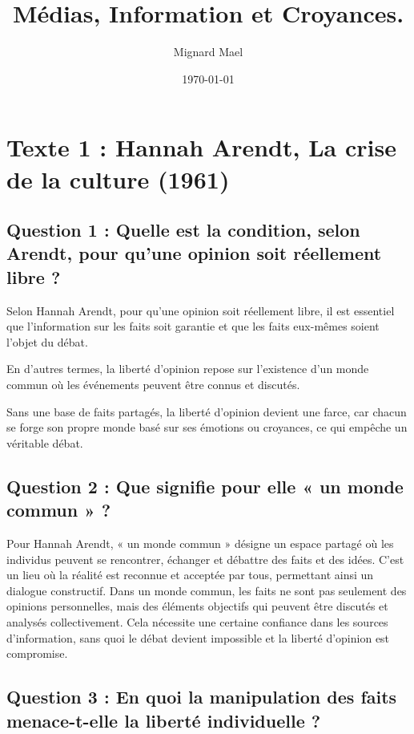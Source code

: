 \documentclass[a4paper,12pt]{article}
\title{Médias, Information et Croyances.}
\author{Mignard Mael}
\date{\today}
\begin{document}
\maketitle

\section{Texte 1 : Hannah Arendt, La crise de la culture (1961)}
\vspace{1cm}

\subsection{Question 1 : Quelle est la condition, selon Arendt, pour qu’une opinion soit réellement libre ?}
Selon Hannah Arendt, pour qu’une opinion soit réellement libre, il est essentiel que l’information sur les faits soit garantie et que les faits eux-mêmes soient l’objet du débat. 

En d'autres termes, la liberté d’opinion repose sur l’existence d’un monde commun où les événements peuvent être connus et discutés. 

Sans une base de faits partagés, la liberté d’opinion devient une farce, car chacun se forge son propre monde basé sur ses émotions ou croyances, ce qui empêche un véritable débat.

\subsection{Question 2 : Que signifie pour elle « un monde commun » ?} 

Pour Hannah Arendt, « un monde commun » désigne un espace partagé où les individus peuvent se rencontrer, échanger et débattre des faits et des idées. C'est un lieu où la réalité est reconnue et acceptée par tous, permettant ainsi un dialogue constructif. Dans un monde commun, les faits ne sont pas seulement des opinions personnelles, mais des éléments objectifs qui peuvent être discutés et analysés collectivement. Cela nécessite une certaine confiance dans les sources d'information, sans quoi le débat devient impossible et la liberté d'opinion est compromise.

\subsection{Question 3 : En quoi la manipulation des faits menace-t-elle la liberté individuelle ?}
\end{document}
